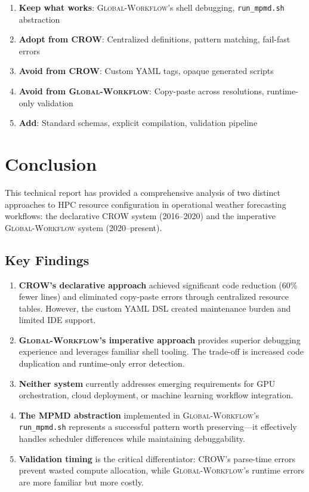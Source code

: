 \documentclass[11pt,twoside]{article}
\newcommand{\crow}{\textsc{CROW}}
\newcommand{\gw}{\textsc{Global-Workflow}}
\newcommand{\mpmd}{\textsc{MPMD}}
\begin{document}
\begin{enumerate}[leftmargin=2em]
    \item \textbf{Keep what works}: \gw{}'s shell debugging, \texttt{run\_mpmd.sh} abstraction
    \item \textbf{Adopt from \crow{}}: Centralized definitions, pattern matching, fail-fast errors
    \item \textbf{Avoid from \crow{}}: Custom YAML tags, opaque generated scripts
    \item \textbf{Avoid from \gw{}}: Copy-paste across resolutions, runtime-only validation
    \item \textbf{Add}: Standard schemas, explicit compilation, validation pipeline
\end{enumerate}

\section{Conclusion}
\label{sec:conclusion}

This technical report has provided a comprehensive analysis of two distinct approaches to HPC resource configuration in operational weather forecasting workflows: the declarative \crow{} system (2016--2020) and the imperative \gw{} system (2020--present).

\subsection{Key Findings}

\begin{enumerate}[leftmargin=2em]
    \item \textbf{\crow{}'s declarative approach} achieved significant code reduction (60\% fewer lines) and eliminated copy-paste errors through centralized resource tables. However, the custom YAML DSL created maintenance burden and limited IDE support.
    
    \item \textbf{\gw{}'s imperative approach} provides superior debugging experience and leverages familiar shell tooling. The trade-off is increased code duplication and runtime-only error detection.
    
    \item \textbf{Neither system} currently addresses emerging requirements for GPU orchestration, cloud deployment, or machine learning workflow integration.
    
    \item \textbf{The \mpmd{} abstraction} implemented in \gw{}'s \texttt{run\_mpmd.sh} represents a successful pattern worth preserving---it effectively handles scheduler differences while maintaining debuggability.
    
    \item \textbf{Validation timing} is the critical differentiator: \crow{}'s parse-time errors prevent wasted compute allocation, while \gw{}'s runtime errors are more familiar but more costly.
\end{enumerate}
\end{document}
